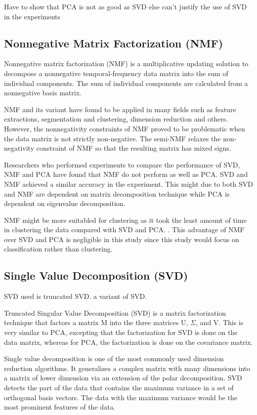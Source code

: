 Have to show that PCA is not as good as SVD else can't justify the use of SVD in the experiments

\clearpage
\subsection{Nonnegative Matrix Factorization (NMF)}
Nonnegative matrix factorization (NMF) is a multiplicative updating solution to decompose a nonnegative temporal-frequency data matrix into the sum of individual components. The sum of individual components are calculated from a nonnegative basis matrix. \cite{nmfBook}

NMF and its variant have found to be applied in many fields such as feature extractions, segmentation and clustering, dimension reduction and others. However, the nonnegativity constraints of NMF proved to be problematic when the data matrix is not strictly non-negative. The semi-NMF relaxes the non-negativity constraint of NMF so that the resulting matrix has mixed signs. \cite{semiNmfPca}

Researchers who performed experiments to compare the performance of SVD, NMF and PCA have found that NMF do not perform as well as PCA. SVD and NMF achieved a similar accuracy in the experiment. This might due to both SVD and NMF are dependent on matrix decomposition technique while PCA is dependent on eigenvalue decomposition. \cite{dimReducArabic}

NMF might be more suitabled for clustering as it took the least amount of time in clustering the data compared with SVD and PCA. \cite{dimReducArabic}. This advantage of NMF over SVD and PCA is negligible in this study since this study would focus on classification rather than clustering.

\clearpage
\subsection{Single Value Decomposition (SVD)}
SVD used is truncated SVD. a variant of SVD.

Truncated Singular Value Decomposition (SVD) is a matrix factorization technique that factors a matrix M into the three matrices U, $\Sigma$, and V. This is very similar to PCA, excepting that the factorization for SVD is done on the data matrix, whereas for PCA, the factorization is done on the covariance matrix.

Single value decomposition is one of the most commonly used dimension reduction algorithms. It generalizes a complex matrix with many dimensions into a matrix of lower dimension via an extension of the polar decomposition. SVD detects the part of the data that contains the maximum variance in a set of orthogonal basis vectors. The data with the maximum variance would be the most prominent features of the data. \cite{svdDef}
	
